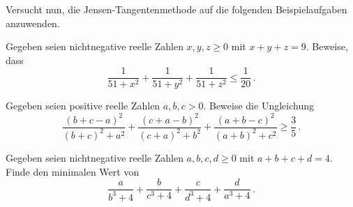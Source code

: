 Versucht nun, die Jensen-Tangentenmethode auf die folgenden Beispielaufgaben anzuwenden.
\begin{aufgabe*}\label{aufgabe:51}
	Gegeben seien nichtnegative reelle Zahlen $x,y,z\geqslant 0$ mit $x+y+z=9$. Beweise, dass
	\begin{equation*}
		\frac{1}{51+x^2}+\frac{1}{51+y^2}+\frac{1}{51+z^2}\leqslant \frac1{20}\,.
	\end{equation*}
\end{aufgabe*}
\begin{aufgabe*}\label{aufgabe:b+c-aUngleichung}
	Gegeben seien positive reelle Zahlen $a,b,c>0$. Beweise die Ungleichung
	\begin{equation*}
		\frac{(b+c-a)^2}{(b+c)^2+a^2}+\frac{(c+a-b)^2}{(c+a)^2+b^2}+\frac{(a+b-c)^2}{(a+b)^2+c^2}\geqslant \frac35\,.
	\end{equation*}
\end{aufgabe*}
\begin{aufgabe*}[*]\label{aufgabe:USAMO2017}
	Gegeben seien nichtnegative reelle Zahlen $a,b,c,d\geqslant 0$ mit $a+b+c+d=4$. Finde den minimalen Wert von
	\begin{equation*}
		\frac{a}{b^3+4}+\frac{b}{c^3+4}+\frac{c}{d^3+4}+\frac{d}{a^3+4}\,.
	\end{equation*}
\end{aufgabe*}

